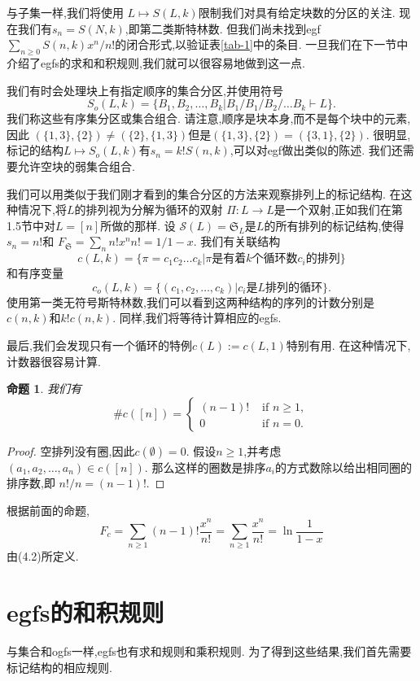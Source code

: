 \documentclass[a4paper,12pt]{ctexbook}
\newtheorem{proposition}[lemma]{\hspace{2em}命题}
\begin{document}
与子集一样,我们将使用
$L\mapsto S(L,k)$限制我们对具有给定块数的分区的关注.  现在我们有$s_n=S(N,k)$,即第二类斯特林数.  但我们尚未找到egf 
$\sum_{n \geq 0}S(n,k)x^{n}/n!$的闭合形式,以验证表\ref{tab-1}中的条目.  一旦我们在下一节中介绍了egfs的求和和积规则,我们就可以很容易地做到这一点.  

我们有时会处理块上有指定顺序的集合分区,并使用符号
$$
S_o(L,k)=\{B_1,B_2,\dots ,B_k|B_1/B_1/B_2/\dots B_k\vdash L\}. 
$$
我们称这些{\kaishu 有序集分区}或{\kaishu 集合组合}.  请注意,顺序是块本身,而不是每个块中的元素,因此
$(\{1,3\},\{2\})\neq(\{2\},\{1,3\})$但是$(\{1,3\},\{2\})=(\{3,1\},\{2\})$.  很明显,标记的结构$L\mapsto S_o(L,k)$有$s_n=k!S(n,k)$,可以对egf做出类似的陈述.  我们还需要允许空块的{\kaishu 弱集合组合}.  

我们可以用类似于我们刚才看到的集合分区的方法来观察排列上的标记结构.  在这种情况下,将$L$的排列视为分解为循环的双射
$\Pi: L \rightarrow L$是一个双射,正如我们在第1.5节中对$L=[n]$所做的那样. 设
$\mathcal{S}(L)=\mathfrak{S}_{L}$是$L$的所有排列的标记结构,使得$s_n=n!$和
$F_\mathfrak{S}=\sum_{n}n!x^{n}{n !}={1}/{1-x}. $
我们有关联结构
$$c(L,k)=\{\pi=c_1c_2\dots c_k|\pi \text{是有着}k\text{个循环数}c_i\text{的排列}\}$$
和有序变量
$$c_o(L,k)=\{(c_1,c_2,\dots ,c_k)|c_i\text{是}L\text{排列的循环}\}. $$
使用第一类无符号斯特林数,我们可以看到这两种结构的序列的计数分别是$c(n,k)$和$k!c(n,k)$.  同样,我们将等待计算相应的egfs.  

最后,我们会发现只有一个循环的特例$c(L):=c(L,1)$特别有用.  在这种情况下,计数器很容易计算.  

\begin{proposition}
	我们有
	$$
	\#c([n])=\begin{cases}
	(n-1)! & \text { if } n \ge 1, \\
	0 & \text { if } n=0. 
	\end{cases} 
	$$
\end{proposition}
\begin{proof}
	空排列没有圈,因此$c(\emptyset)=0$. 假设$ n \ge 1$,并考虑$(a_1,a_2,\dots ,a_n)\in c([n])$. 那么这样的圈数是排序$a_i$的方式数除以给出相同圈的排序数,即
	$n!/n=(n-1)!. $
\end{proof}

根据前面的命题,
$$F_c=\sum_{n \geq 1}(n-1)!\frac{x^{n}}{n !}=\sum_{n \geq 1}\frac{x^{n}}{n !}=\ln {\frac{1}{1-x}}$$
由(4.2)所定义. 
\section{egfs的和积规则}
与集合和ogfs一样,egfs也有求和规则和乘积规则.  为了得到这些结果,我们首先需要标记结构的相应规则.  
\end{document}
